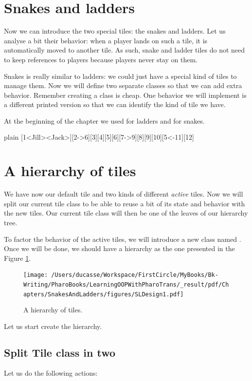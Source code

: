 \documentclass[10pt,twoside,english]{_support/latex/sbabook/sbabook}
\begin{document}
\section{Snakes and ladders}
Now we can introduce the two special tiles: the snakes and ladders. 
Let us analyse a bit their behavior: when a player lands on such a tile, it is automatically moved to another tile. As such, snake and ladder tiles do not need to keep references to players because players never stay on them. 

Snakes is really similar to ladders: we could just have a special kind of tiles to manage them. 
Now we will define two separate classes so that we can add extra behavior. Remember creating a class is cheap. One behavior we will implement is a different printed version so that we can identify the kind of tile we have.

At the beginning of the chapter we used \textcode{-\textgreater{}} for ladders and \textcode{\textless{}-} for snakes. 

\begin{displaycode}{plain}
[1<Jill><Jack>][2->6][3][4][5][6][7->9][8][9][10][5<-11][12]
\end{displaycode}
\section{A hierarchy of tiles}
We have now our default tile and two kinds of different \textit{active} tiles. Now we will split our current tile class to be able to reuse a bit of its state and behavior with the new tiles. Our current tile class will then be one of the leaves of our hierarchy tree.

To factor the behavior of the active tiles, we will introduce a new class named .
Once we will be done, we should have a hierarchy as the one presented in the Figure \ref{fig:sldesign1}.


\begin{figure}

\begin{center}
\texttt{[image: /Users/ducasse/Workspace/FirstCircle/MyBooks/Bk-Writing/PharoBooks/LearningOOPWithPharoTrans/\_result/pdf/Chapters/SnakesAndLadders/figures/SLDesign1.pdf]}\caption{A hierarchy of tiles.\label{fig:sldesign1}}\end{center}
\end{figure}


Let us start create the hierarchy.
\subsection{Split Tile class in two }
Let us do the following actions:
\end{document}
